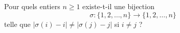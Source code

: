 Pour quels entiers $n \ge 1$ existe-t-il une bijection
$$\sigma : \{1, 2, \dots, n\} \rightarrow \{1, 2, \dots, n\}$$
telle que $\vert \sigma(i) - i \vert \ne \vert \sigma(j) - j \vert$ si $i \ne j$ ?